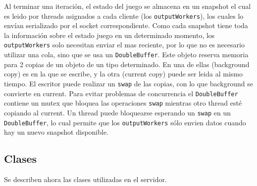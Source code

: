 Al terminar una iteraci\'on, el estado del juego se almacena en un snapshot el cual es leido por threads
asignados a cada cliente (los \texttt{outputWorkers}), los cuales lo env\'ian serializado por el
socket correspondiente. Como cada snapshot tiene toda la informaci\'on sobre el estado juego
en un determinado momento, los \texttt{outputWorkers} solo necesitan enviar el mas reciente, por lo que no
es necesario utilizar una cola, sino que se usa un \texttt{DoubleBuffer}. Este objeto reserva memoria
para 2 copias de un objeto de un tipo determinado. En una de ellas (background copy) es en la que se escribe, y
la otra (current copy) puede ser leida al mismo tiempo. El escritor puede realizar un \texttt{swap} de las copias,
con lo que background se convierte en current. Para evitar problemas de concurrencia el \texttt{DoubleBuffer}
contiene un mutex que bloquea las operaciones \texttt{swap} mientras otro thread est\'e copiando al current.
Un thread puede bloquearse esperando un \texttt{swap} en un \texttt{DoubleBuffer}, lo cual permite que los
\texttt{outputWorkers} s\'olo envien datos cuando hay un nuevo snapshot disponible.

\subsection{Clases}

Se describen ahora las clases utilizadas en el servidor.

